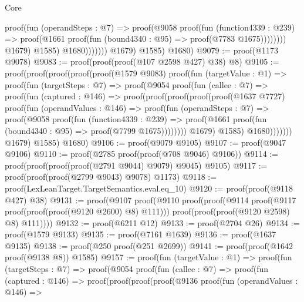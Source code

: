 \begin{lexlean}{Core}
\begin{coremodule}
                                    proof(fun (operandSteps : @7) =>
                                      proof(@9058
                                          proof(fun (function4339 : @239) =>
                                            proof(@1661
                                                proof(fun (bound4340 : @95) =>
                                                  proof(@7783 @1675))))))))
                                @1679)
                              @1585)
                            @1680)))))))
          @1679)
        @1585)
      @1680)
@9079 := proof(@1173 @9078)
@9083 := proof(proof(proof(@107 @2598 @427) @38) @8)
@9105 := proof(proof(proof(proof(proof(@1579 @9083)
            proof(fun (targetValue : @1) =>
              proof(fun (targetSteps : @7) =>
                proof(@9054
                    proof(fun (callee : @7) =>
                      proof(fun (captured : @146) =>
                        proof(proof(proof(proof(proof(@1637 @7727)
                                  proof(fun (operandValues : @146) =>
                                    proof(fun (operandSteps : @7) =>
                                      proof(@9058
                                          proof(fun (function4339 : @239) =>
                                            proof(@1661
                                                proof(fun (bound4340 : @95) =>
                                                  proof(@7799 @1675))))))))
                                @1679)
                              @1585)
                            @1680)))))))
          @1679)
        @1585)
      @1680)
@9106 := proof(@9079 @9105)
@9107 := proof(@9047 @9106)
@9110 := proof(@2785 proof(proof(@708 @9046) @9106))
@9114 := proof(proof(proof(proof(@2791 @9044) @9079) @9045) @9105)
@9117 := proof(proof(proof(@2799 @9043) @9078) @1173)
@9118 := proof(LexLeanTarget.TargetSemantics.eval.eq_10)
@9120 := proof(proof(@9118 @427) @38)
@9131 := proof(@9107
      proof(@9110
          proof(proof(@9114 proof(@9117 proof(proof(proof(@9120 @2600) @8) @111)))
              proof(proof(proof(@9120 @2598) @8) @111))))
@9132 := proof(@6211 @12)
@9133 := proof(@2704 @26)
@9134 := proof(@1579 @9133)
@9135 := proof(@7161 @1639)
@9136 := proof(@1637 @9135)
@9138 := proof(@250 proof(@251 @2699))
@9141 := proof(proof(@1642 proof(@9138 @8)) @1585)
@9157 := proof(fun (targetValue : @1) =>
    proof(fun (targetSteps : @7) =>
      proof(@9054
          proof(fun (callee : @7) =>
            proof(fun (captured : @146) =>
              proof(proof(proof(proof(@9136
                        proof(fun (operandValues : @146) =>

\end{coremodule}
\end{lexlean}
